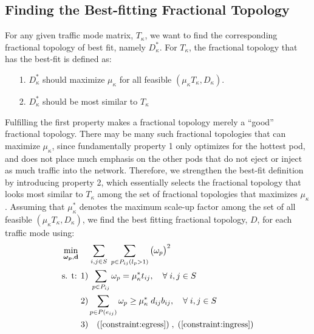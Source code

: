 \documentclass[sigconf]{acmart}
\theoremstyle{definition}
\begin{document}
\subsection{Finding the Best-fitting Fractional Topology}
For any given traffic mode matrix, $T_\kappa$, we want to find the corresponding fractional topology of best fit, namely $D_\kappa^*$. For $T_\kappa$, the fractional topology that has the best-fit is defined as:
\begin{enumerate}
    \item[1.] $D_\kappa^*$ should maximize $\mu_\kappa$ for all feasible $(\mu_\kappa T_\kappa, D_\kappa)$.
    \item[2.] $D_\kappa^*$ should be most similar to $T_\kappa$
\end{enumerate}
Fulfilling the first property makes a fractional topology merely a ``good'' fractional topology. There may be many such fractional topologies that can maximize $\mu_\kappa$, since fundamentally property 1 only optimizes for the hottest pod, and does not place much emphasis on the other pods that do not eject or inject as much traffic into the network. Therefore, we strengthen the best-fit definition by introducing property 2, which essentially selects the fractional topology that looks most similar to $T_\kappa$ among the set of fractional topologies that maximizes $\mu_\kappa$. Assuming that $\mu_\kappa^*$ denotes the maximum scale-up factor among the set of all feasible $(\mu_\kappa T_\kappa, D_\kappa)$, we find the best fitting fractional topology, $D$, for each traffic mode using:
\begin{equation}
\begin{aligned}
\min\limits_{\boldsymbol{\omega_p}, \mathbf{d}} \;& \quad \sum_{i, j \in S} \; \sum_{p \in P_{ij}(l_p > 1)}\big(\omega_{p}\big)^2 \\
\text{s. t: } & 1) \; \sum_{p \in P_{ij}} \omega_{p} = \mu_{\kappa}^* t_{ij}, \quad \forall \; i, j \in S \\
& 2) \sum\limits_{p \in P(e_{ij})} \omega_{p} \geq \mu_{\kappa}^* \; d_{ij} b_{ij}, \quad \forall \; i, j \in S\\
& 3) \quad (\ref{constraint:egress}) \; , \; (\ref{constraint:ingress})
\end{aligned}\label{fractional_graph_qp}
\end{equation}
\end{document}
